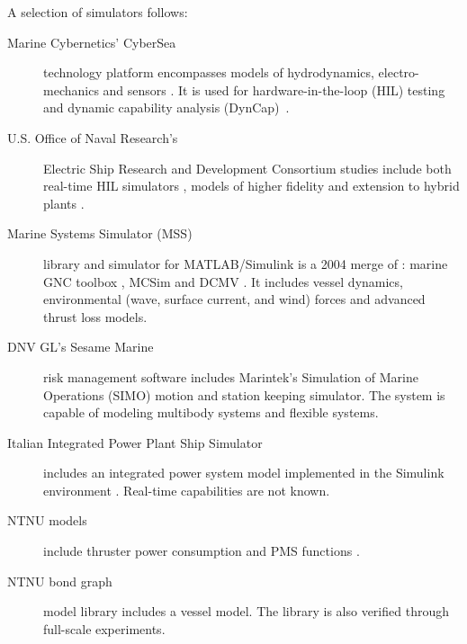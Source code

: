 \documentclass[journal]{IEEEtran}
\begin{document}
A selection of simulators follows:
\begin{description}
\item[Marine Cybernetics' CyberSea] technology platform encompasses models of hydrodynamics, electro-mechanics
and sensors \cite{MarineCybernetics2014}. It is used for hardware-in-the-loop
(HIL) testing~\cite{Johansen2009} and dynamic capability analysis (DynCap)~\cite{Pivano2014}.


\item[U.S. Office of Naval Research's] Electric Ship Research and Development Consortium studies include both real-time HIL simulators \cite{RenSteurerWoodruff2005}, models of higher fidelity \cite{SteurerAndrusLangstonQiSuryanarayananWoodruffRibeiro2007} and extension to hybrid plants \cite{xie2009analysis}.

\item[Marine Systems Simulator (MSS)] \cite{MSS2010} library and simulator for MATLAB/Simulink is a 2004 merge of \cite[Sec. 1]{MSS}: marine GNC toolbox \cite{Fossen2002},
MCSim \cite{SorensenPedersenSmogeli2003} and DCMV \cite{PerezBlanke2003}.
It includes vessel dynamics, environmental (wave, surface current,
and wind) forces and advanced thrust loss models.

\item[DNV GL's Sesame Marine] \cite{DNV2014} risk management software includes Marintek's
Simulation of Marine Operations (SIMO) motion and station keeping
simulator. The system is capable of modeling multibody systems and
flexible systems. %

\item[Italian Integrated Power Plant Ship Simulator] includes an integrated
power system model implemented in the Simulink environment \cite{BosichFilippoGiulivoSulligoiTessarolo2012}. Real-time capabilities are not known.

\item[NTNU models]
include thruster power consumption \cite{Hansen2001} and PMS functions \cite{Radan2008}.

\item[NTNU bond graph]
model library \cite{Pedersen2012} includes a vessel model. The library is also verified through full-scale experiments.
\end{description}
\end{document}

